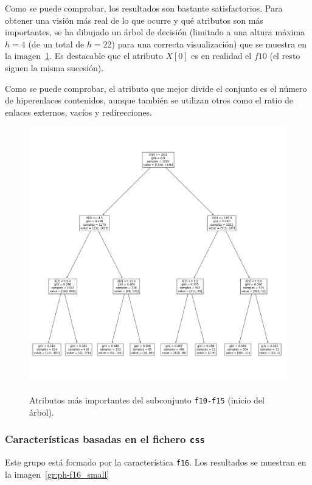 Como se puede comprobar, los resultados son bastante satisfactorios. Para obtener una visión más real de lo que ocurre y qué atributos son más importantes, se ha dibujado un árbol de decisión (limitado a una altura máxima $h = 4$ (de un total de $h = 22$) para una correcta visualización) que se muestra en la imagen~\ref{gr:ph-f10f15_tree}. Es destacable que el atributo $X[0]$ es en realidad el $f10$ (el resto siguen la misma sucesión).

Como se puede comprobar, el atributo que mejor divide el conjunto es el número de hiperenlaces contenidos, aunque también se utilizan otros como el ratio de enlaces externos, vacíos y redirecciones.

\begin{figure}[h]
	\caption[\textit{Phishing}: detección (\texttt{f10-f15}, atributos relevantes)]{Atributos más importantes del subconjunto \texttt{f10-f15} (inicio del árbol).}
	\centering
	\includegraphics[width=\textwidth]{../img/memoria/5_phishing/f10f15_tree}
	\label{gr:ph-f10f15_tree}
\end{figure}


\subsubsection{Características basadas en el fichero \texttt{css}}
Este grupo está formado por la característica \texttt{f16}. Los resultados se muestran en la imagen~\ref{gr:ph-f16_small}

